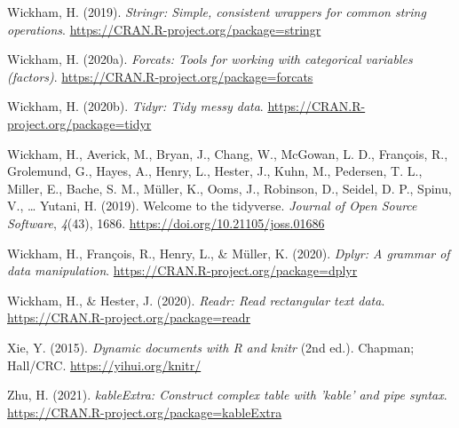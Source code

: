 \documentclass[
  man]{apa6}
\newlength{\cslhangindent}
\newlength{\cslentryspacingunit} %
\newenvironment{CSLReferences}[2] %
 {%
  \setlength{\parindent}{0pt}
  \ifodd #1
  \let\oldpar\par
  \def\par{\hangindent=\cslhangindent\oldpar}
  \fi
  \setlength{\parskip}{#2\cslentryspacingunit}
 }%
 {}
\begin{document}
\begin{CSLReferences}{1}{0}
\leavevmode{}%
Wickham, H. (2019). \emph{Stringr: Simple, consistent wrappers for common string operations}. \url{https://CRAN.R-project.org/package=stringr}

\leavevmode{}%
Wickham, H. (2020a). \emph{Forcats: Tools for working with categorical variables (factors)}. \url{https://CRAN.R-project.org/package=forcats}

\leavevmode{}%
Wickham, H. (2020b). \emph{Tidyr: Tidy messy data}. \url{https://CRAN.R-project.org/package=tidyr}

\leavevmode{}%
Wickham, H., Averick, M., Bryan, J., Chang, W., McGowan, L. D., François, R., Grolemund, G., Hayes, A., Henry, L., Hester, J., Kuhn, M., Pedersen, T. L., Miller, E., Bache, S. M., Müller, K., Ooms, J., Robinson, D., Seidel, D. P., Spinu, V., \ldots{} Yutani, H. (2019). Welcome to the {tidyverse}. \emph{Journal of Open Source Software}, \emph{4}(43), 1686. \url{https://doi.org/10.21105/joss.01686}

\leavevmode{}%
Wickham, H., François, R., Henry, L., \& Müller, K. (2020). \emph{Dplyr: A grammar of data manipulation}. \url{https://CRAN.R-project.org/package=dplyr}

\leavevmode{}%
Wickham, H., \& Hester, J. (2020). \emph{Readr: Read rectangular text data}. \url{https://CRAN.R-project.org/package=readr}

\leavevmode{}%
Xie, Y. (2015). \emph{Dynamic documents with {R} and knitr} (2nd ed.). Chapman; Hall/CRC. \url{https://yihui.org/knitr/}

\leavevmode{}%
Zhu, H. (2021). \emph{kableExtra: Construct complex table with 'kable' and pipe syntax}. \url{https://CRAN.R-project.org/package=kableExtra}

\end{CSLReferences}


\clearpage
\makeatletter
\efloat@restorefloats
\makeatother
\end{document}
